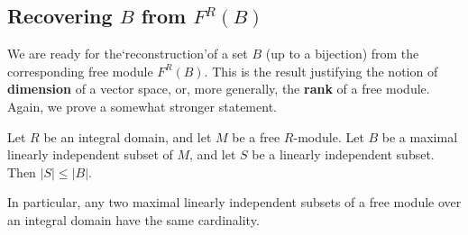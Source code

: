 \subsection{Recovering $B$ from $F^R(B)$}
We are ready for the‘reconstruction’of a set $B$ (up to a bijection) from the corresponding free module $F^R(B)$. This is the result justifying the notion of \textbf{dimension} of a vector space, or, more generally, the \textbf{rank} of a free module. Again, we prove a somewhat stronger statement.
\begin{proposition}\label{Free mod card}
Let $R$ be an integral domain, and let $M$ be a free $R$-module. Let $B$ be a maximal linearly independent subset of $M$, and let $S$ be a linearly independent subset. Then $|S|\leqslant|B|$.\par
In particular, any two maximal linearly independent subsets of a free module over an integral domain have the same cardinality.
\end{proposition}
